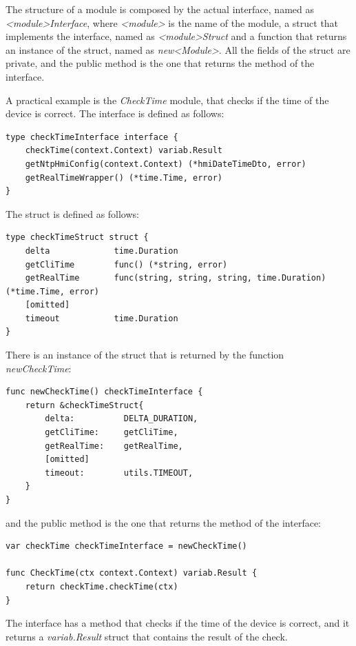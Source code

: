 The structure of a module is composed by the actual interface, named as \textit{<module>Interface}, where \textit{<module>} is the name of the module, a struct that implements the interface, named as \textit{<module>Struct} and a function that returns an instance of the struct, named as \textit{new<Module>}.
All the fields of the struct are private, and the public method is the one that returns the method of the interface.

A practical example is the \textit{CheckTime} module, that checks if the time of the device is correct. The interface is defined as follows:

\begin{lstlisting}[style=golang]
type checkTimeInterface interface {
	checkTime(context.Context) variab.Result
	getNtpHmiConfig(context.Context) (*hmiDateTimeDto, error)
	getRealTimeWrapper() (*time.Time, error)
}
\end{lstlisting}

The struct is defined as follows:

\begin{lstlisting}[style=golang]
type checkTimeStruct struct {
	delta             time.Duration
	getCliTime        func() (*string, error)
	getRealTime       func(string, string, string, time.Duration) (*time.Time, error)
	[omitted]
	timeout           time.Duration
}
\end{lstlisting}

There is an instance of the struct that is returned by the function \textit{newCheckTime}:

\begin{lstlisting}[style=golang]
func newCheckTime() checkTimeInterface {
	return &checkTimeStruct{
		delta:          DELTA_DURATION,
		getCliTime:     getCliTime,
		getRealTime:    getRealTime,
		[omitted]
		timeout:        utils.TIMEOUT,
	}
}
\end{lstlisting}

and the public method is the one that returns the method of the interface:

\begin{lstlisting}[style=golang]
var checkTime checkTimeInterface = newCheckTime()

func CheckTime(ctx context.Context) variab.Result {
	return checkTime.checkTime(ctx)
}
\end{lstlisting}

The interface has a method that checks if the time of the device is correct, and it returns a \textit{variab.Result} struct that contains the result of the check.


